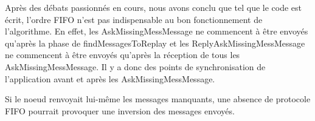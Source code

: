 \documentclass[11pt,a4paper]{report}
\begin{document}
Après des débats passionnés en cours, nous avons conclu que tel que le code est écrit, l'ordre FIFO n'est pas indispensable au bon fonctionnement de l'algorithme. En effet, les AskMissingMessMessage ne commencent à être envoyés qu'après la phase de findMessagesToReplay et les ReplyAskMissingMessMessage ne commencent à être envoyés qu'après la réception de tous les AskMissingMessMessage. Il y a donc des points de synchronisation de l'application avant et après les AskMissingMessMessage.

Si le noeud renvoyait lui-même les messages manquants, une absence de protocole FIFO pourrait provoquer une inversion des messages envoyés.
\chapter{}
\end{document}
